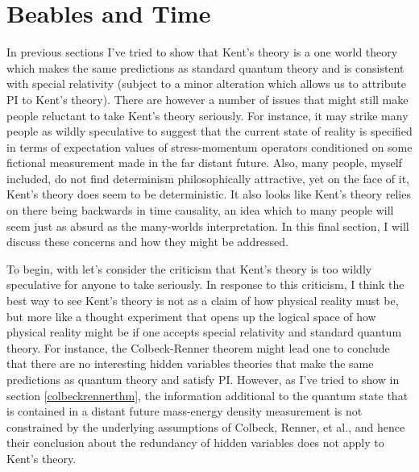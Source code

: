 \section{Beables and Time\label{beablesandtime}}
In previous sections I've tried to show that Kent's theory is a one world theory which makes the same predictions as standard quantum theory and is consistent with special relativity (subject to a minor alteration which allows us to attribute PI to Kent's theory). There are however a number of issues that might still make people reluctant to take Kent's theory seriously. For instance, it may strike many people as wildly speculative to suggest that the current state of reality is specified in terms of expectation values of stress-momentum operators conditioned on some fictional measurement made in the far distant future. Also, many people, myself included, do not find determinism philosophically attractive, yet on the face of it, Kent's theory does seem to be deterministic. It also looks like Kent's theory relies on there being backwards in time causality, an idea which to many people will seem just as absurd as the many-worlds interpretation. In this final section, I will discuss these concerns and how they might be addressed.

To begin, with let's consider the criticism that Kent's theory is too wildly speculative for anyone to take seriously. In response to this criticism, I think the best way to see Kent's theory is not as a claim of how physical reality must be, but more like a thought experiment that opens up the logical space of how physical reality might be if one accepts special relativity and standard quantum theory. For instance, the Colbeck-Renner theorem might lead one to conclude that there are no interesting hidden variables theories that make the same predictions as quantum theory and satisfy PI. However, as I've tried to show in section \ref{colbeckrennerthm}, the information additional to the quantum state that is contained in a distant future mass-energy density measurement is not constrained by the underlying assumptions of Colbeck, Renner, et al., and hence their conclusion about the redundancy of hidden variables does not apply to Kent's theory. 

